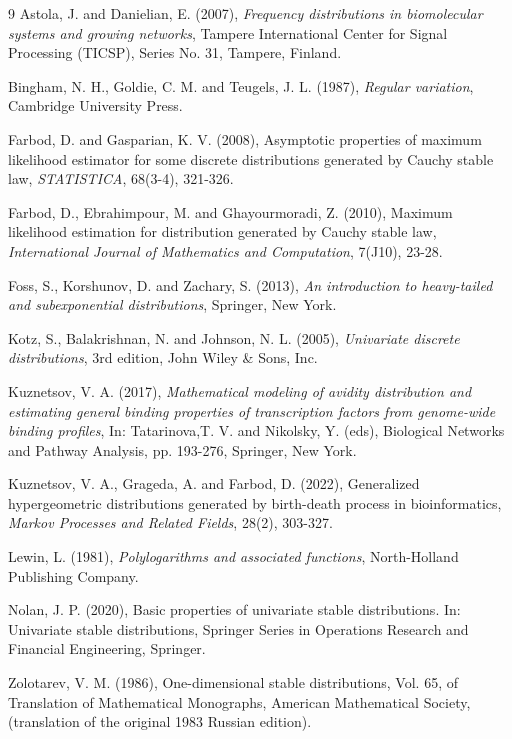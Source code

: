 \documentclass[twoside]{article}
\begin{document}
 
 

\begin{thebibliography}{9}
Astola, J.  and  Danielian, E.  (2007), {\it Frequency distributions in biomolecular systems and growing networks}, Tampere International Center for Signal Processing (TICSP), Series No. 31, Tampere, Finland. 

Bingham, N. H., Goldie, C. M. and Teugels, J. L. (1987),  {\it Regular variation}, Cambridge University Press.
 
Farbod, D.  and  Gasparian, K. V.  (2008), Asymptotic properties of maximum likelihood estimator for some discrete distributions generated by Cauchy stable law, {\it STATISTICA}, 68(3-4), 321-326. 

Farbod, D.,  Ebrahimpour, M. and Ghayourmoradi, Z. (2010), Maximum likelihood estimation for distribution generated by Cauchy stable law, {\it International Journal of Mathematics and Computation}, 7(J10), 23-28.

Foss, S., Korshunov, D. and Zachary, S. (2013), {\it An introduction to heavy-tailed and subexponential distributions}, Springer, New York.

Kotz, S., Balakrishnan, N. and Johnson, N. L.  (2005),  {\it Univariate discrete distributions}, 3rd edition, John Wiley & Sons, Inc.

Kuznetsov, V. A. (2017),  {\it Mathematical modeling of avidity distribution and estimating general binding properties of transcription factors from genome-wide binding profiles}, In: Tatarinova,T. V. and Nikolsky, Y. (eds), Biological Networks and Pathway Analysis, pp. 193-276, Springer, New York.

Kuznetsov, V. A., Grageda, A. and  Farbod, D. (2022), Generalized hypergeometric distributions generated by birth-death process in bioinformatics, {\it Markov Processes and Related Fields}, 28(2), 303-327.

 
Lewin, L. (1981),  {\it Polylogarithms and associated functions}, North-Holland Publishing Company.

Nolan, J. P. (2020),  Basic properties of univariate stable distributions. In: Univariate stable
distributions, Springer Series in Operations Research and Financial Engineering, Springer.

 
Zolotarev, V. M. (1986), One-dimensional stable distributions, Vol. 65, of Translation of Mathematical Monographs, American Mathematical Society, (translation of the original 1983 Russian edition).




\end{thebibliography}
 
\end{document}
